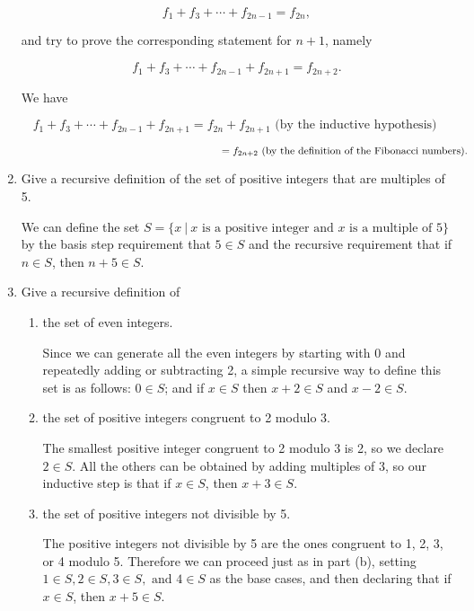 \documentclass[11pt]{article}
\begin{document}
\begin{enumerate}[label=\textbf{\arabic*.}]
	$$f_1 + f_3 + \cdots + f_{2n - 1} = f_{2n},$$
	
	and try to prove the corresponding statement for $n + 1$, namely
	
	$$f_1 + f_3 + \cdots + f_{2n - 1} + f_{2n + 1} = f_{2n + 2}.$$
	
	We have
	
	$$f_1 + f_3 + \cdots + f_{2n - 1} + f_{2n + 1} = f_{2n} + f_{2n + 1} \text{ (by the inductive hypothesis) }$$
	
	$$\hspace{6.7cm} = f_{2n + 2} \text{ (by the definition of the Fibonacci numbers). }$$
	
	\item Give a recursive definition of the set of positive integers that are multiples of 5.
	
	We can define the set $S = \{ x\ |\ x \text{ is a positive integer and } x \text{ is a multiple of } 5 \}$ by the basis step requirement that $5 \in S$ and the recursive requirement that if $n \in S$, then $n + 5 \in S$.
	
	\item Give a recursive definition of
	
	\begin{enumerate}[label=\textbf{\alph*)}]
		\item the set of even integers.
		
		Since we can generate all the even integers by starting with 0 and repeatedly adding or subtracting 2, a simple recursive way to define this set is as follows: $0 \in S$; and if $x \in S$ then $x + 2 \in S$ and $x - 2 \in S$.
		
		\item the set of positive integers congruent to 2 modulo 3.
		
		The smallest positive integer congruent to 2 modulo 3 is 2, so we declare $2 \in S$. All the others can be obtained by adding multiples of 3, so our inductive step is that if $x \in S$, then $x + 3 \in S$.
		
		\item the set of positive integers not divisible by 5.
		
		The positive integers not divisible by 5 are the ones congruent to 1, 2, 3, or 4 modulo 5. Therefore we can proceed just as in part (b), setting $1 \in S, 2 \in S, 3 \in S, \text{ and } 4 \in S$ as the base cases, and then declaring that if $x \in S$, then $x + 5 \in S$.
	\end{enumerate}


\end{enumerate}
\end{document}
